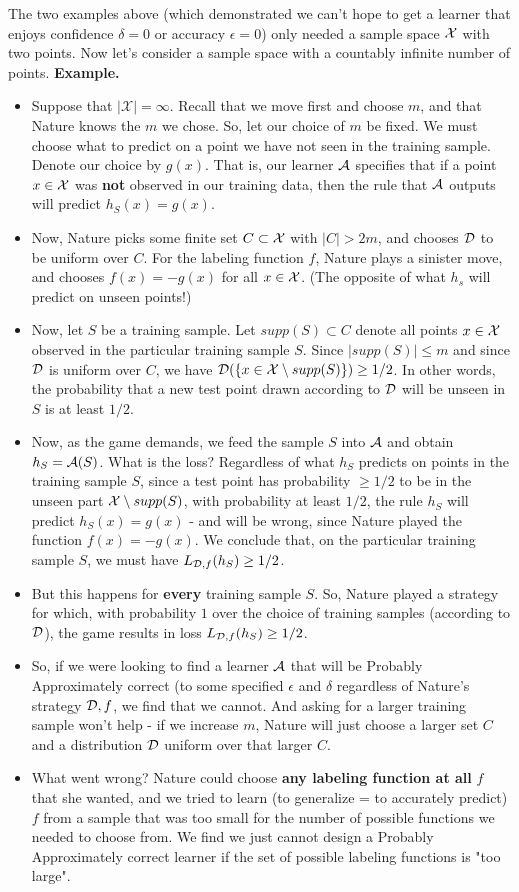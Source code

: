 {The two examples above (which demonstrated we can't hope to get a learner that enjoys confidence $\delta=0$ or accuracy $\epsilon=0$) only needed a sample space $\mathcal{X}$ with two points. 
Now let's consider a sample space with a countably infinite number of points.  
\vspace{3mm}
{\bf Example.}
\begin{itemize}
	\item Suppose that $|\mathcal{X}| = \infty$. Recall that we move first and choose $m$, and that Nature knows the $m$ we chose. So, let our choice of $m$ be fixed. We must choose what to predict on a point we have not seen in the training sample. Denote our choice by 
	$g(x)$. That is, our learner $\mathcal{A}$ specifies that if a point $x\in\mathcal{X}$ was {\bf not} observed in our training data, then the rule that $\mathcal{A}$ outputs will predict $h_S(x)=g(x)$. 
	\item Now, Nature picks some finite set $C \subset \mathcal{X}$ with $ |C| > 2m$, and chooses $\mathcal{D}$ to be uniform 
	over $C$. For the labeling function $f$, Nature plays a sinister move, and chooses $f(x)=-g(x)$ for all $x\in\mathcal{X}$. (The opposite of what $h_s$ will predict on unseen points!)
	\item Now, let $S$ be a training sample. Let $supp(S)\subset C$ denote all points $x\in\mathcal{X}$ observed in the particular training sample $S$.
	Since $|supp(S)|\leq m$ and since $\mathcal{D}$ is uniform over $C$, we have $\mathcal{D}(\{x\in \mathcal{X}\setminus supp(S)\})\geq 1/2$.
	In other words, the probability that a new test point drawn according to $\mathcal{D}$ will be unseen in $S$ is at least $1/2$.
	\item Now, as the game demands, we feed the sample $S$ into $\mathcal{A}$ and obtain $h_S=\mathcal{A}(S)$. What is the loss? Regardless of what $h_S$ predicts on points in the training sample $S$, since a test point has probability $\geq 1/2$ to be in the unseen part $\mathcal{X}\setminus supp(S)$, with probability at least $1/2$, the rule $h_S$ will predict $h_S(x)=g(x)$ - and will be wrong, since Nature played the function $f(x)=-g(x)$. We conclude that, on the particular training sample $S$, we must have $L_{\mathcal{D},f}(h_S)\geq 1/2$.
	\item But this happens for {\bf every} training sample $S$. So, Nature played a strategy for which, with probability $1$ over the choice of training samples (according to $\mathcal{D}$), the game results in loss  $L_{\mathcal{D},f}(h_S)\geq 1/2$.
	\item So, if we were looking to find a learner $\mathcal{A}$ that will be Probably
	Approximately correct (to some specified $\epsilon$ and $\delta$ regardless of Nature's strategy $\mathcal{D},f$, we find that we cannot. And asking for a larger training sample won't help - if we increase $m$, Nature will just choose a larger set $C$ and a distribution $\mathcal{D}$ uniform over that larger $C$.
	\item What went wrong? Nature could choose {\bf any labeling function at all} $f$ that she wanted, and we tried to learn (to generalize = to accurately predict) $f$ from a sample that was too small for the number of possible functions we needed to choose from. We find we just cannot design a Probably Approximately correct learner if the set of possible labeling functions is "too large". 
\end{itemize} 

}
